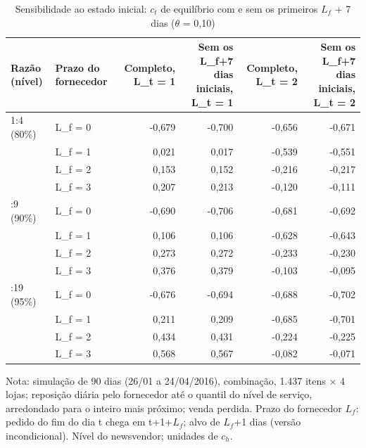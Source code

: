 \begin{table}[htbp]
\centering
\small
\caption{Sensibilidade ao estado inicial: $c_t$ de equilíbrio com e sem os primeiros $L_f$ + 7 dias ($\theta$ = 0,10)}
\label{tab:tbr_aquecimento}
\begin{tabular}{llrrrr}
\toprule
Razão (nível) & Prazo do fornecedor & Completo, L\_t = 1 & Sem os L\_f+7 dias iniciais, L\_t = 1 & Completo, L\_t = 2 & Sem os L\_f+7 dias iniciais, L\_t = 2 \\
\midrule
1:4 (80\%) & L\_f = 0 & -0,679 & -0,700 & -0,656 & -0,671 \\
 & L\_f = 1 & 0,021 & 0,017 & -0,539 & -0,551 \\
 & L\_f = 2 & 0,153 & 0,152 & -0,216 & -0,217 \\
 & L\_f = 3 & 0,207 & 0,213 & -0,120 & -0,111 \\
\addlinespace
1:9 (90\%) & L\_f = 0 & -0,690 & -0,706 & -0,681 & -0,692 \\
 & L\_f = 1 & 0,106 & 0,106 & -0,628 & -0,643 \\
 & L\_f = 2 & 0,273 & 0,272 & -0,233 & -0,230 \\
 & L\_f = 3 & 0,376 & 0,379 & -0,103 & -0,095 \\
\addlinespace
1:19 (95\%) & L\_f = 0 & -0,676 & -0,694 & -0,688 & -0,702 \\
 & L\_f = 1 & 0,211 & 0,209 & -0,685 & -0,701 \\
 & L\_f = 2 & 0,434 & 0,431 & -0,224 & -0,225 \\
 & L\_f = 3 & 0,568 & 0,567 & -0,082 & -0,071 \\
\bottomrule
\end{tabular}
\par\smallskip
{\footnotesize Nota: simulação de 90 dias (26/01 a 24/04/2016), combinação, 1.437 itens × 4 lojas; reposição diária pelo fornecedor até o quantil do nível de serviço, arredondado para o inteiro mais próximo; venda perdida. Prazo do fornecedor $L_f$: pedido do fim do dia t chega em t+1+$L_f$; alvo de $L_f$+1 dias (versão incondicional). Nível do newsvendor; unidades de $c_h$.}
\end{table}
